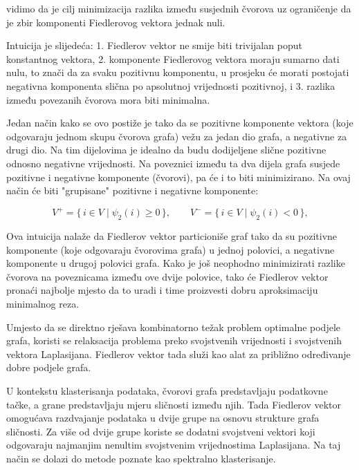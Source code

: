 vidimo da je cilj minimizacija razlika između susjednih čvorova uz ograničenje da je zbir komponenti Fiedlerovog vektora jednak nuli.

Intuicija je slijedeća: 1. Fiedlerov vektor ne smije biti trivijalan poput konstantnog vektora, 2. komponente Fiedlerovog vektora moraju sumarno dati nulu, to znači da za svaku pozitivnu komponentu, u prosjeku će morati postojati negativna komponenta slična po apsolutnoj vrijednosti pozitivnoj, i 3. razlika između povezanih čvorova mora biti minimalna.

Jedan način kako se ovo postiže je tako da se pozitivne komponente vektora (koje odgovaraju jednom skupu čvorova grafa) vežu za jedan dio grafa, a negativne za drugi dio. Na tim dijelovima je idealno da budu dodijeljene slične pozitivne odnosno negativne vrijednosti. Na poveznici između ta dva dijela grafa susjede pozitivne i negativne komponente (čvorovi), pa će i to biti minimizirano. Na ovaj način će biti "grupisane" pozitivne i negativne komponente:

\begin{equation}
V^{+} = \{\, i \in V \mid \psi_2(i) \geq 0 \,\}, 
\qquad
V^{-} = \{\, i \in V \mid \psi_2(i) < 0 \,\},
\end{equation}

Ova intuicija nalaže da Fiedlerov vektor particioniše graf tako da su pozitivne komponente (koje odgovaraju čvorovima grafa) u jednoj polovici, a negativne komponente u drugoj polovici grafa. Kako je još neophodno minimizirati razlike čvorova na poveznicama između ove dvije polovice, tako će Fiedlerov vektor pronaći najbolje mjesto da to uradi i time proizvesti dobru aproksimaciju minimalnog reza.

Umjesto da se direktno rješava kombinatorno
težak problem optimalne podjele grafa, koristi se relaksacija problema preko svojstvenih vrijednosti i svojstvenih vektora Laplasijana. Fiedlerov vektor tada služi kao alat za približno određivanje dobre podjele grafa.

U kontekstu klasterisanja podataka, čvorovi grafa predstavljaju podatkovne tačke, a grane predstavljaju mjeru sličnosti između njih. Tada Fiedlerov vektor omogućava razdvajanje podataka u dvije grupe na osnovu strukture grafa sličnosti. Za više od dvije grupe koriste se dodatni svojstveni vektori koji odgovaraju najmanjim nenultim svojstvenim vrijednostima Laplasijana. Na taj način se dolazi do metode poznate kao spektralno klasterisanje.




